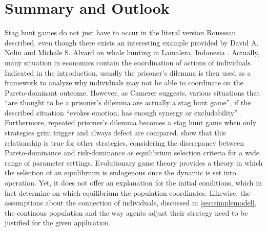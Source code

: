 \documentclass[11pt]{article}
\begin{document}
\section{Summary and Outlook}
Stag hunt games do not just have to occur in the literal version Rousseau
described, even though there exists an interesting example provided by 
David A. Nolin and Michale S. Alvard on whale hunting in Lamalera, Indonesia
\parencite{nolin_meat-sharing_2000}.
Actually, many situation in economics contain the coordination of actions
of individuals. 
Indicated in the introduction, usually the prisoner's dilemma is then used
as a framework to analyze why individuals may not be able to coordinate on the 
Pareto-dominant outcome. However, as Camerer
suggests, various situations that ``are thought to be a prisoner's dilemma 
are actually a stag hunt game'', if the described situation ``evokes emotion,
has enough synergy or excludability'' 
\parencite[376-377]{camerer_behavioral_2003}. Furthermore, repeated prisoner's
dilemma becomes a stag hunt game when only strategies grim trigger
and always defect are compared. \textcite{blonski_prisoners_2003} show that
this relationship is true for other strategies, considering the discrepancy
between Pareto-dominance and risk-dominance as equilibrium selection criteria 
for a wide range of parameter settings. 
Evolutionary game theory provides a theory in which the selection of an
equilibrium is endogenous once the dynamic is set into operation. Yet, it
does not offer an explanation for the initial conditions, which in fact 
determine on which equilibrium the population coordinates. Likewise, the
assumptions about the connection of individuals, discussed in 
\ref{sec:simplemodel}, the continous population and the way agents
adjust their strategy need to be justified for the given application. 
\end{document}
